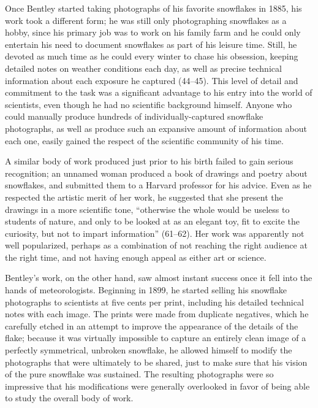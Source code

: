 Once Bentley started taking photographs of his favorite snowflakes in 1885, his
work took a different form; he was still only photographing snowflakes as a
hobby, since his primary job was to work on his family farm and he could only
entertain his need to document snowflakes as part of his leisure time. Still, he
devoted as much time as he could every winter to chase his obsession, keeping
detailed notes on weather conditions each day, as well as precise technical
information about each exposure he captured (44--45). This level of detail and
commitment to the task was a significant advantage to his entry into the world
of scientists, even though he had no scientific background himself. Anyone who
could manually produce hundreds of individually-captured snowflake photographs,
as well as produce such an expansive amount of information about each one,
easily gained the respect of the scientific community of his time.

A similar body of work produced just prior to his birth failed to gain serious
recognition; an unnamed woman produced a book of drawings and poetry about
snowflakes, and submitted them to a Harvard professor for his advice. Even as he
respected the artistic merit of her work, he suggested that she present the
drawings in a more scientific tone, ``otherwise the whole would be useless to
students of nature, and only to be looked at as an elegant toy, fit to excite
the curiosity, but not to impart information'' (61--62). Her work was apparently
not well popularized, perhaps as a combination of not reaching the right
audience at the right time, and not having enough appeal as either art or
science.

Bentley's work, on the other hand, saw almost instant success once it fell into
the hands of meteorologists. Beginning in 1899, he started selling his snowflake
photographs to scientists at five cents per print, including his detailed
technical notes with each image. The prints were made from duplicate negatives,
which he carefully etched in an attempt to improve the appearance of the details
of the flake; because it was virtually impossible to capture an entirely clean
image of a perfectly symmetrical, unbroken snowflake, he allowed himself to
modify the photographs that were ultimately to be shared, just to make sure that
his vision of the pure snowflake was sustained. The resulting photographs were
so impressive that his modifications were generally overlooked in favor of being
able to study the overall body of work.

